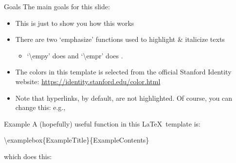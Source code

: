 





\begin{frame}{Goals}
The main goals for this slide:
\begin{itemize}
	\item This is just to show you how this  works
	\item There are two `emphasize' functions used to highlight \& italicize texts
	\begin{itemize}
		\item `\textbackslash empy' does  and `\textbackslash empr' does .
	\end{itemize}
	\item The colors in this template is selected from the official Stanford Identity website: \href{https://identity.stanford.edu/color.html}{https://identity.stanford.edu/color.html}
	\item Note that hyperlinks, by default, are not highlighted. Of course, you can change this: e.g., 
\end{itemize}
\end{frame}



\begin{frame}{Example}
A (hopefully) useful function in this \LaTeX~template is:
\begin{center}
	\textbackslash examplebox\{ExampleTitle\}\{ExampleContents\}
\end{center}
which does this:
\end{frame}



